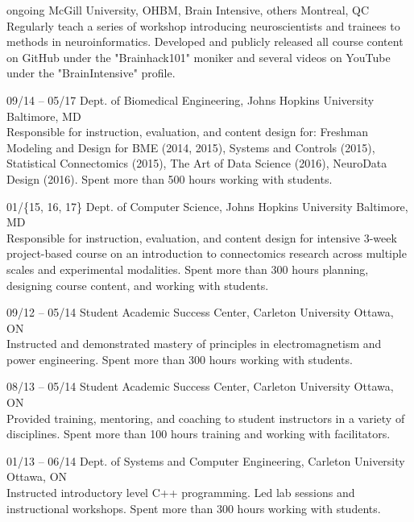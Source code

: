 \documentclass[]{friggeri-cv} %
\begin{document}
\begin{entrylist}
\entry
{ongoing}
{McGill University, OHBM, Brain Intensive, others}
{Montreal, QC}
{ \\
Regularly teach a series of workshop introducing neuroscientists and trainees to methods in neuroinformatics.
Developed and publicly released all course content on GitHub under the "Brainhack101" moniker and several videos on
YouTube under the "BrainIntensive" profile.}

\entry
{09/14 -- 05/17}
{Dept. of Biomedical Engineering, Johns Hopkins University}
{Baltimore, MD}
{ \\
Responsible for instruction, evaluation, and content design for: Freshman Modeling and Design
for BME (2014, 2015), Systems and Controls (2015), Statistical Connectomics (2015), The Art of
Data Science (2016), NeuroData Design (2016). Spent more than 500 hours working with students.}

\entry
{01/\{15, 16, 17\}}
{Dept. of Computer Science, Johns Hopkins University}
{Baltimore, MD}
{\\
Responsible for instruction, evaluation, and content design for intensive 3-week project-based course on an
introduction to connectomics research across multiple scales and experimental modalities. Spent more than 300 hours
planning, designing course content, and working with students.}

\entry
{09/12 -- 05/14}
{Student Academic Success Center, Carleton University}
{Ottawa, ON}
{\\
Instructed and demonstrated mastery of principles in electromagnetism and power engineering. Spent more than 300 hours
working with students.}

\entry
{08/13 -- 05/14}
{Student Academic Success Center, Carleton University}
{Ottawa, ON}
{\\
Provided training, mentoring, and coaching to student instructors in a variety of disciplines. Spent more than 100
hours training and working with facilitators.}

\entry
{01/13 -- 06/14}
{Dept. of Systems and Computer Engineering, Carleton University}
{Ottawa, ON}
{\\
Instructed introductory level C++ programming. Led lab sessions and instructional workshops. Spent more than 300 hours
working with students.}
\end{entrylist}
\end{document}

